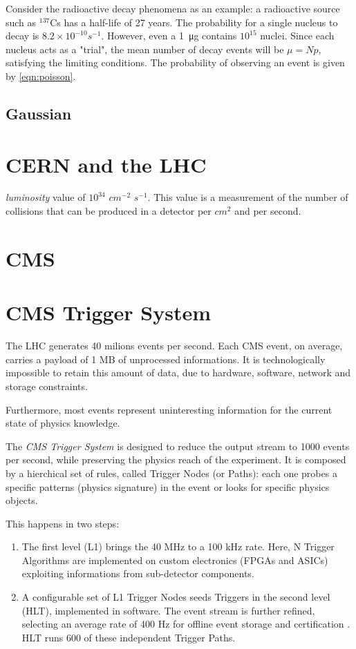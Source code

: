 Consider the radioactive decay phenomena as an example: a radioactive source such as $^{137}$Cs has a half-life of 27 years. The probability for a single nucleus to decay is $8.2 \times 10^{-10}s^{-1}$. However, even a \SI{1}{\micro\gram} contains $10^{15}$ nuclei. Since each nucleus acts as a "trial", the mean number of decay events will be $\mu = N p$, satisfying the limiting conditions. The probability of observing an event is given by \ref{eqn:poisson}.

\subsection{Gaussian}

\section{CERN and the LHC}

\textit{luminosity} value of $10^{34}$ $cm^{-2}$ $s^{-1}$. This value is a measurement of the number of collisions that can be produced in a detector per $cm^2$ and per second.

\section{CMS}

\section{CMS Trigger System}


The LHC generates 40 milions events per second. Each CMS event, on average, carries a payload of 1 MB of unprocessed informations. It is technologically impossible to retain this amount of data, due to hardware, software, network and storage constraints.

Furthermore, most events represent uninteresting information for the current state of physics knowledge.

The \textit{CMS Trigger System} is designed to reduce the output stream to 1000 events per second, while preserving the physics reach of the experiment.
It is composed by a hierchical set of rules, called Trigger Nodes (or Paths): each one probes a specific patterns (physics signature) in the event or looks for specific physics objects.

This happens in two steps:

\begin{enumerate}

	\item The first level (L1) \cite{Bayatyan:706847} brings the 40 MHz to a 100 kHz rate. Here, N Trigger Algorithms are implemented on custom electronics (FPGAs and ASICs) exploiting informations from sub-detector components.

	\item A configurable set of L1 Trigger Nodes seeds Triggers in the second level (HLT), implemented in software. The event stream is further refined, selecting an average rate of 400 Hz for offline event storage and certification \cite{Khachatryan_2017}. HLT runs 600 of these independent Trigger Paths.

\end{enumerate}